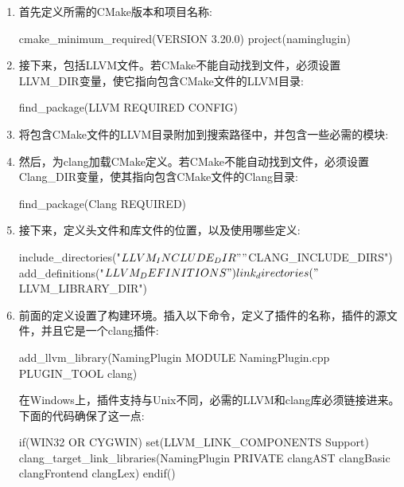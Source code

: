 \begin{enumerate}
\item
首先定义所需的CMake版本和项目名称:

\begin{cmake}
cmake_minimum_required(VERSION 3.20.0)
project(naminglugin)
\end{cmake}

\item
接下来，包括LLVM文件。若CMake不能自动找到文件，必须设置LLVM\_DIR变量，使它指向包含CMake文件的LLVM目录:

\begin{cmake}
find_package(LLVM REQUIRED CONFIG)
\end{cmake}

\item
将包含CMake文件的LLVM目录附加到搜索路径中，并包含一些必需的模块:


\item
然后，为clang加载CMake定义。若CMake不能自动找到文件，必须设置Clang\_DIR变量，使其指向包含CMake文件的Clang目录:

\begin{cmake}
find_package(Clang REQUIRED)
\end{cmake}

\item
接下来，定义头文件和库文件的位置，以及使用哪些定义:

\begin{cmake}
include_directories("${LLVM_INCLUDE_DIR}"
                    "${CLANG_INCLUDE_DIRS}")
add_definitions("${LLVM_DEFINITIONS}")
link_directories("${LLVM_LIBRARY_DIR}")
\end{cmake}

\item
前面的定义设置了构建环境。插入以下命令，定义了插件的名称，插件的源文件，并且它是一个clang插件:

\begin{cmake}
add_llvm_library(NamingPlugin MODULE NamingPlugin.cpp
                 PLUGIN_TOOL clang)
\end{cmake}

在Windows上，插件支持与Unix不同，必需的LLVM和clang库必须链接进来。下面的代码确保了这一点:

\begin{cmake}
if(WIN32 OR CYGWIN)
    set(LLVM_LINK_COMPONENTS Support)
    clang_target_link_libraries(NamingPlugin PRIVATE
        clangAST clangBasic clangFrontend clangLex)
endif()
\end{cmake}

\end{enumerate}

